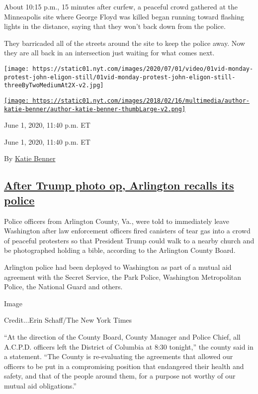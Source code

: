 About 10:15 p.m., 15 minutes after curfew, a peaceful crowd gathered at
the Minneapolis site where George Floyd was killed began running toward
flashing lights in the distance, saying that they won't back down from
the police.

They barricaded all of the streets around the site to keep the police
away. Now they are all back in an intersection just waiting for what
comes next.

\texttt{[image: https://static01.nyt.com/images/2020/07/01/video/01vid-monday-protest-john-eligon-still/01vid-monday-protest-john-eligon-still-threeByTwoMediumAt2X-v2.jpg]}

\href{https://www.nytimes.com/by/katie-benner}{\texttt{[image: https://static01.nyt.com/images/2018/02/16/multimedia/author-katie-benner/author-katie-benner-thumbLarge-v2.png]}}

June 1, 2020, 11:40 p.m. ET

June 1, 2020, 11:40 p.m. ET

By \href{https://www.nytimes.com/by/katie-benner}{Katie Benner}

\hypertarget{after-trump-photo-op-arlington-recalls-its-police}{%
\subsection{\texorpdfstring{\protect\hyperlink{after-trump-photo-op-arlington-recalls-its-police}{After
Trump photo op, Arlington recalls its
police}}{After Trump photo op, Arlington recalls its police}}\label{after-trump-photo-op-arlington-recalls-its-police}}

Police officers from Arlington County, Va., were told to immediately
leave Washington after law enforcement officers fired canisters of tear
gas into a crowd of peaceful protesters so that President Trump could
walk to a nearby church and be photographed holding a bible, according
to the Arlington County Board.

Arlington police had been deployed to Washington as part of a mutual aid
agreement with the Secret Service, the Park Police, Washington
Metropolitan Police, the National Guard and others.

Image

Credit...Erin Schaff/The New York Times

``At the direction of the County Board, County Manager and Police Chief,
all A.C.P.D. officers left the District of Columbia at 8:30 tonight,''
the county said in a statement. ``The County is re-evaluating the
agreements that allowed our officers to be put in a compromising
position that endangered their health and safety, and that of the people
around them, for a purpose not worthy of our mutual aid obligations.''

